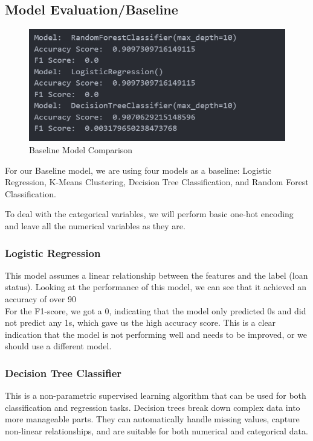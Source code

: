 \documentclass[sigplan]{acmart}
\begin{document}
\subsection{Model Evaluation/Baseline}
\begin{figure}[b]
    \centering
    \includegraphics[width=\linewidth]{images/baseline.png}
    \caption{Baseline Model Comparison}
\end{figure}

For our Baseline model, we are using four models as a baseline: Logistic Regression, K-Means Clustering, Decision Tree Classification, and Random Forest Classification.

To deal with the categorical variables, we will perform basic one-hot encoding and leave all the numerical variables as they are.

\subsubsection{Logistic Regression}
This model assumes a linear relationship between the features and the label (loan status). Looking at the performance of this model, we can see that it achieved an accuracy of over 90\\%

For the F1-score, we got a 0, indicating that the model only predicted 0s and did not predict any 1s, which gave us the high accuracy score. This is a clear indication that the model is not performing well and needs to be improved, or we should use a different model.

\subsubsection{Decision Tree Classifier}
This is a non-parametric supervised learning algorithm that can be used for both classification and regression tasks. Decision trees break down complex data into more manageable parts. They can automatically handle missing values, capture non-linear relationships, and are suitable for both numerical and categorical data.
\end{document}
